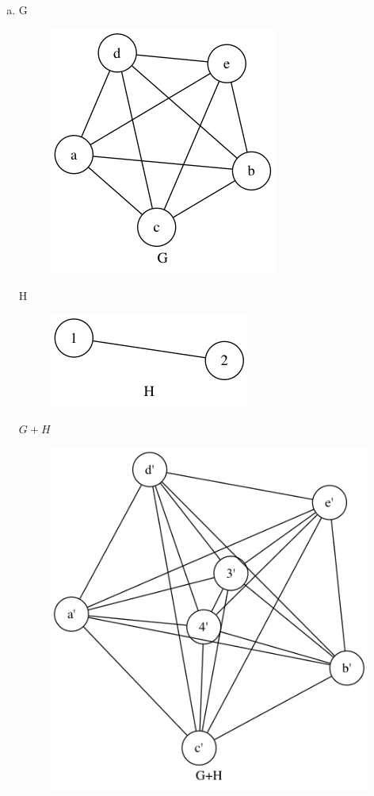 \begin{enumerate}[(a)]
    \item G 
    \begin{figure}[H]
    \centering
    \includegraphics[scale=0.5]{115/115aG.png}
    \end{figure}
    H
    \begin{figure}[H]
    \centering
    \includegraphics[scale=0.5]{115/115aH.png}
    \end{figure}
    $G+H$
    \begin{figure}[H]
    \centering
    \includegraphics[scale=0.5]{115/115aGH.png}

\end{figure}
\end{enumerate}
